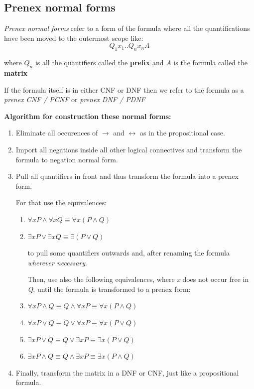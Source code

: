 \documentclass[10pt,a4paper]{article}
\begin{document}
\subsection{Prenex normal forms}

\textit{Prenex normal forms} \cite[p. 59]{LecPartII} refer to a form of the formula where all the quantifications have been moved to the outermost scope like:
$$ Q_1 x_1 .. Q_n x_n A $$

where $ Q_n $ is all the quantifiers called the \textbf{prefix} and $ A $ is the formula called the \textbf{matrix}

If the formula itself is in either CNF or DNF then we refer to the formula as a \textit{prenex CNF / PCNF} or \textit{prenex DNF / PDNF}

\textbf{Algorithm for construction these normal forms:}

\begin{enumerate}
\item Eliminate all occurences of $ \to $ and $ \leftrightarrow $ as in the propositional case.
\item Import all negations inside all other logical connectives and transform the formula to negation normal form.
\item Pull all quantifiers in front and thus transform the formula into a prenex form.

For that use the equivalences:
      \begin{enumerate}
\item $ \forall x P \land \forall x Q \equiv \forall x(P \land Q) $
\item $ \exists x P \lor \exists x Q \equiv \exists(P \lor Q) $

to pull some quantifiers outwards and, after renaming the formula \textit{wherever necessary}.

Then, use also the following equivalences, where \textit{x} does not occur free in \textit{Q}, until the formula is transformed to a prenex form:

\item $ \forall x P \land Q \equiv Q \land \forall x P \equiv \forall x(P\land Q) $
\item $ \forall x P \lor Q \equiv Q \lor \forall x P \equiv \forall x(P \lor Q) $
\item $ \exists x P \lor Q \equiv Q \lor \exists x P \equiv \exists x (P \lor Q) $
\item $ \exists x P \land Q \equiv Q \land \exists x P \equiv \exists x(P\land Q) $
\end{enumerate}
\item Finally, transform the matrix in a DNF or CNF, just like a propositional formula.
\end{enumerate}
\end{document}

